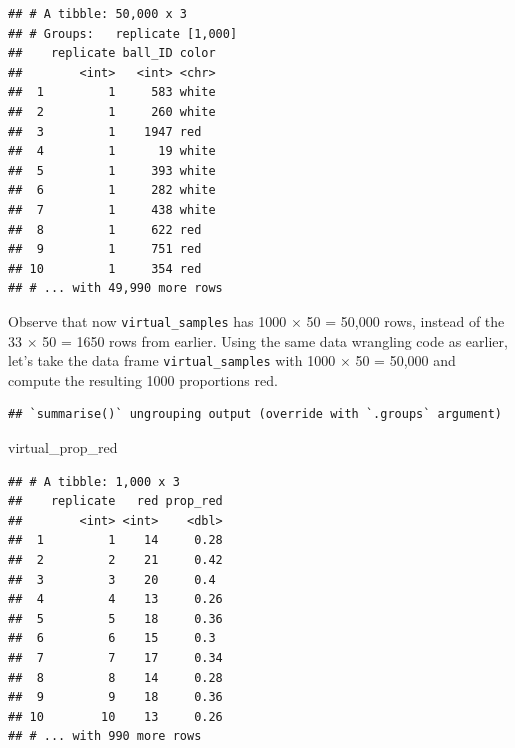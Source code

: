 \documentclass[
]{book}
\newenvironment{Shaded}{\begin{snugshade}}{\end{snugshade}}
\newcommand{\DataTypeTok}[1]{\textcolor[rgb]{0.13,0.29,0.53}{#1}}
\newcommand{\DecValTok}[1]{\textcolor[rgb]{0.00,0.00,0.81}{#1}}
\newcommand{\KeywordTok}[1]{\textcolor[rgb]{0.13,0.29,0.53}{\textbf{#1}}}
\newcommand{\NormalTok}[1]{#1}
\newcommand{\OperatorTok}[1]{\textcolor[rgb]{0.81,0.36,0.00}{\textbf{#1}}}
\newcommand{\StringTok}[1]{\textcolor[rgb]{0.31,0.60,0.02}{#1}}
\begin{document}
\begin{verbatim}
## # A tibble: 50,000 x 3
## # Groups:   replicate [1,000]
##    replicate ball_ID color
##        <int>   <int> <chr>
##  1         1     583 white
##  2         1     260 white
##  3         1    1947 red  
##  4         1      19 white
##  5         1     393 white
##  6         1     282 white
##  7         1     438 white
##  8         1     622 red  
##  9         1     751 red  
## 10         1     354 red  
## # ... with 49,990 more rows
\end{verbatim}

Observe that now \texttt{virtual\_samples} has 1000 \(\times\) 50 = 50,000 rows, instead of the 33 \(\times\) 50 = 1650 rows from earlier. Using the same data wrangling code as earlier, let's take the data frame \texttt{virtual\_samples} with 1000 \(\times\) 50 = 50,000 and compute the resulting 1000 proportions red.

\begin{Shaded}
\end{Shaded}

\begin{verbatim}
## `summarise()` ungrouping output (override with `.groups` argument)
\end{verbatim}

\begin{Shaded}
\begin{Highlighting}[]
\NormalTok{virtual_prop_red}
\end{Highlighting}
\end{Shaded}

\begin{verbatim}
## # A tibble: 1,000 x 3
##    replicate   red prop_red
##        <int> <int>    <dbl>
##  1         1    14     0.28
##  2         2    21     0.42
##  3         3    20     0.4 
##  4         4    13     0.26
##  5         5    18     0.36
##  6         6    15     0.3 
##  7         7    17     0.34
##  8         8    14     0.28
##  9         9    18     0.36
## 10        10    13     0.26
## # ... with 990 more rows
\end{verbatim}
\end{document}
